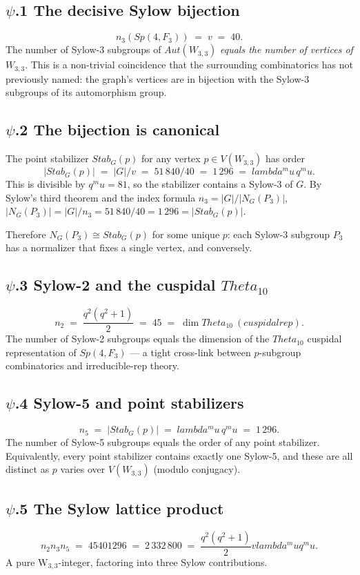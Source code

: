 \documentclass[12pt,a4paper]{article}
\def\mathbb#1{#1}%
\def\mathrm#1{#1}%
\def\text#1{#1}%
\def\lambda{lambda}%
\def\mu{mu}%
\def\Theta{Theta}%
\def\cdot{ }%
\theoremstyle{definition}
\newcommand{\Sp}{\mathrm{Sp}}
\newcommand{\Aut}{\mathrm{Aut}}
\newcommand{\FF}{\mathbb{F}}
\begin{document}
\subsection*{$\psi$.1 \quad The decisive Sylow bijection}
\[
\boxed{\;n_3(\Sp(4,\FF_3)) \;=\; v \;=\; 40.\;}
\]
The number of Sylow-3 subgroups of $\Aut(W_{3,3})$ \emph{equals the
number of vertices of $W_{3,3}$}. This is a non-trivial coincidence
that the surrounding combinatorics has not previously named: the
graph's vertices are in bijection with the Sylow-3 subgroups of its
automorphism group.

\subsection*{$\psi$.2 \quad The bijection is canonical}
The point stabilizer $\mathrm{Stab}_G(p)$ for any vertex $p\in V(W_{3,3})$
has order
\[
|\mathrm{Stab}_G(p)| \;=\; |G|/v \;=\; 51\,840/40 \;=\; 1\,296 \;=\; \lambda^\mu\,q^\mu.
\]
This is divisible by $q^\mu = 81$, so the stabilizer contains a
Sylow-3 of $G$. By Sylow's third theorem and the index formula
$n_3 = |G|/|N_G(P_3)|$, $|N_G(P_3)| = |G|/n_3 = 51\,840/40 = 1\,296 =
|\mathrm{Stab}_G(p)|$.

Therefore $N_G(P_3) \cong \mathrm{Stab}_G(p)$ for some unique $p$:
each Sylow-3 subgroup $P_3$ has a normalizer that fixes a single
vertex, and conversely.

\subsection*{$\psi$.3 \quad Sylow-2 and the cuspidal $\Theta_{10}$}
\[
n_2 \;=\; \frac{q^2(q^2+1)}{2} \;=\; 45 \;=\; \dim\Theta_{10}\ \text{(cuspidal rep)}.
\]
The number of Sylow-2 subgroups equals the dimension of the $\Theta_{10}$
cuspidal representation of $\Sp(4,\FF_3)$ — a tight cross-link between
$p$-subgroup combinatorics and irreducible-rep theory.

\subsection*{$\psi$.4 \quad Sylow-5 and point stabilizers}
\[
n_5 \;=\; |\mathrm{Stab}_G(p)| \;=\; \lambda^\mu\,q^\mu \;=\; 1\,296.
\]
The number of Sylow-5 subgroups equals the order of any point
stabilizer. Equivalently, every point stabilizer contains exactly one
Sylow-5, and these are all distinct as $p$ varies over $V(W_{3,3})$
(modulo conjugacy).

\subsection*{$\psi$.5 \quad The Sylow lattice product}
\[
n_2 \cdot n_3 \cdot n_5 \;=\; 45\cdot 40\cdot 1296 \;=\; 2\,332\,800
\;=\; \frac{q^2(q^2+1)}{2}\cdot v \cdot \lambda^\mu q^\mu.
\]
A pure W$_{3,3}$-integer, factoring into three Sylow contributions.
\end{document}
